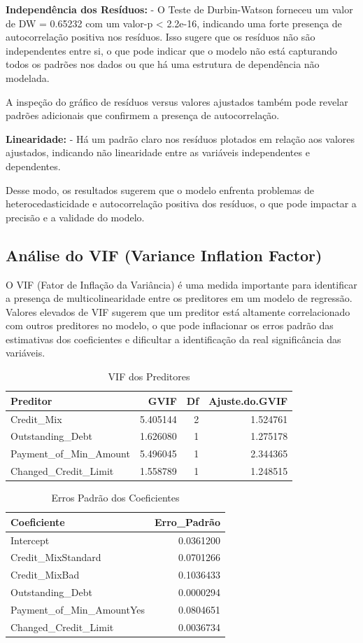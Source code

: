 \documentclass[
  letterpaper,
  DIV=11,
  numbers=noendperiod]{scrreprt}
\begin{document}
\textbf{Independência dos Resíduos:} - O Teste de Durbin-Watson forneceu
um valor de DW = 0.65232 com um valor-p \textless{} 2.2e-16, indicando
uma forte presença de autocorrelação positiva nos resíduos. Isso sugere
que os resíduos não são independentes entre si, o que pode indicar que o
modelo não está capturando todos os padrões nos dados ou que há uma
estrutura de dependência não modelada.

A inspeção do gráfico de resíduos versus valores ajustados também pode
revelar padrões adicionais que confirmem a presença de autocorrelação.

\textbf{Linearidade:} - Há um padrão claro nos resíduos plotados em
relação aos valores ajustados, indicando não linearidade entre as
variáveis independentes e dependentes.

Desse modo, os resultados sugerem que o modelo enfrenta problemas de
heterocedasticidade e autocorrelação positiva dos resíduos, o que pode
impactar a precisão e a validade do modelo.

\subsection{Análise do VIF (Variance Inflation
Factor)}\label{anuxe1lise-do-vif-variance-inflation-factor}

O VIF (Fator de Inflação da Variância) é uma medida importante para
identificar a presença de multicolinearidade entre os preditores em um
modelo de regressão. Valores elevados de VIF sugerem que um preditor
está altamente correlacionado com outros preditores no modelo, o que
pode inflacionar os erros padrão das estimativas dos coeficientes e
dificultar a identificação da real significância das variáveis.

\begin{longtable}[t]{lrrr}
\caption{\label{tab:unnamed-chunk-39}VIF dos Preditores}\\
\toprule
Preditor & GVIF & Df & Ajuste.do.GVIF\\
\midrule
Credit\_Mix & 5.405144 & 2 & 1.524761\\
Outstanding\_Debt & 1.626080 & 1 & 1.275178\\
Payment\_of\_Min\_Amount & 5.496045 & 1 & 2.344365\\
Changed\_Credit\_Limit & 1.558789 & 1 & 1.248515\\
\bottomrule
\end{longtable}

\begin{longtable}[t]{lr}
\caption{\label{tab:unnamed-chunk-40}Erros Padrão dos Coeficientes}\\
\toprule
Coeficiente & Erro\_Padrão\\
\midrule
Intercept & 0.0361200\\
Credit\_MixStandard & 0.0701266\\
Credit\_MixBad & 0.1036433\\
Outstanding\_Debt & 0.0000294\\
Payment\_of\_Min\_AmountYes & 0.0804651\\
\addlinespace
Changed\_Credit\_Limit & 0.0036734\\
\bottomrule
\end{longtable}
\end{document}
